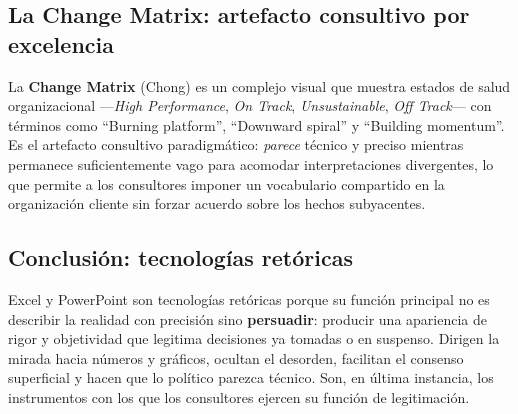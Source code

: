 \documentclass[a4paper,12pt]{article}
\begin{document}
\subsection*{La Change Matrix: artefacto consultivo por excelencia}

La \textbf{Change Matrix} (Chong) es un complejo visual que muestra estados de salud organizacional ---\textit{High Performance}, \textit{On Track}, \textit{Unsustainable}, \textit{Off Track}--- con términos como ``Burning platform'', ``Downward spiral'' y ``Building momentum''. Es el artefacto consultivo paradigmático: \textit{parece} técnico y preciso mientras permanece suficientemente vago para acomodar interpretaciones divergentes, lo que permite a los consultores imponer un vocabulario compartido en la organización cliente sin forzar acuerdo sobre los hechos subyacentes.

\subsection*{Conclusión: tecnologías retóricas}

Excel y PowerPoint son tecnologías retóricas porque su función principal no es describir la realidad con precisión sino \textbf{persuadir}: producir una apariencia de rigor y objetividad que legitima decisiones ya tomadas o en suspenso. Dirigen la mirada hacia números y gráficos, ocultan el desorden, facilitan el consenso superficial y hacen que lo político parezca técnico. Son, en última instancia, los instrumentos con los que los consultores ejercen su función de legitimación.
\end{document}
